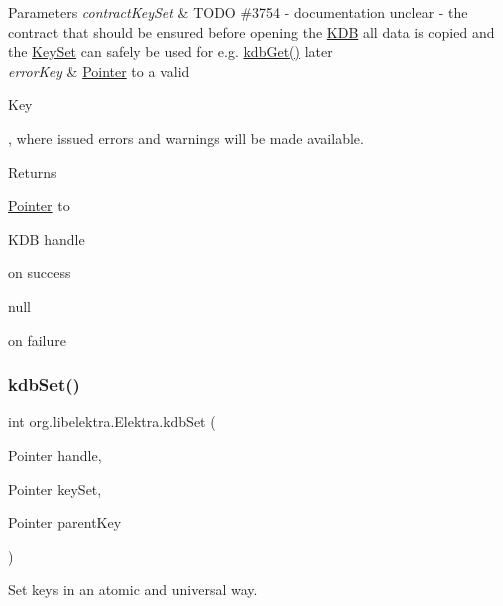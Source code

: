 \begin{DoxyParams}{Parameters}
{\em contract\+Key\+Set} & T\+O\+DO \#3754 -\/ documentation unclear -\/ the contract that should be ensured before opening the \hyperlink{classorg_1_1libelektra_1_1KDB}{K\+DB} all data is copied and the \hyperlink{classorg_1_1libelektra_1_1KeySet}{Key\+Set} can safely be used for e.\+g. \hyperlink{interfaceorg_1_1libelektra_1_1Elektra_a09ad2a446a215b6cce4cfb31d9871ac2}{kdb\+Get()} later \\
\hline
{\em error\+Key} & \hyperlink{}{Pointer} to a valid
\begin{DoxyCode}
Key 
\end{DoxyCode}
 , where issued errors and warnings will be made available. \\
\hline
\end{DoxyParams}
\begin{DoxyReturn}{Returns}

\begin{DoxyItemize}
\item \hyperlink{}{Pointer} to
\begin{DoxyCode}
KDB handle 
\end{DoxyCode}
 on success 
\item 
\begin{DoxyCode}
null 
\end{DoxyCode}
 on failure 
\end{DoxyItemize}
\end{DoxyReturn}
\mbox{\label{interfaceorg_1_1libelektra_1_1Elektra_a7b69b22fd8b712891d188215707e0540}} 
\subsubsection{\texorpdfstring{kdb\+Set()}{kdbSet()}}
{\footnotesize\ttfamily int org.\+libelektra.\+Elektra.\+kdb\+Set (\begin{DoxyParamCaption}\item[{Pointer}]{handle,  }\item[{Pointer}]{key\+Set,  }\item[{Pointer}]{parent\+Key }\end{DoxyParamCaption})}



Set keys in an atomic and universal way. 

